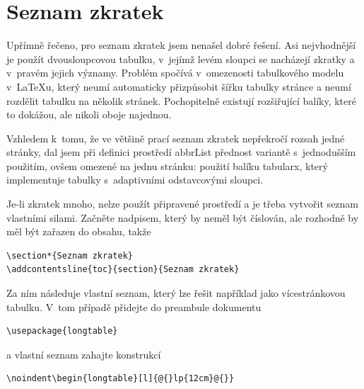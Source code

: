 \documentclass[FZS,DP,EN]{tulthesis}
\newcommand{\argument}[1]{{\ttfamily\color{\tulcolor}#1}}
\newenvironment{myquote}{\begin{list}{}{\setlength\leftmargin\parindent}\item[]}{\end{list}}
\newenvironment{listing}{\begin{myquote}\color{\tulcolor}}{\end{myquote}}
\begin{document}
\section{Seznam zkratek}\label{zkratky}

Upřímně řečeno, pro seznam zkratek jsem nenašel dobré řešení. Asi nejvhodnější
je použít dvousloupcovou tabulku, v~jejímž levém sloupci se nacházejí zkratky a
v~pravém jejich významy. Problém spočívá v~omezenosti tabulkového modelu
v~\LaTeX u, který neumí automaticky přizpůsobit šířku tabulky stránce a neumí
rozdělit tabulku na několik stránek. Pochopitelně existují rozšiřující balíky,
které to dokážou, ale nikoli oboje najednou.

Vzhledem k~tomu, že ve většině prací seznam zkratek nepřekročí rozsah jedné
stránky, dal jsem při definici prostředí \argument{abbrList} přednost variantě
s~jednodušším použitím, ovšem omezené na jednu stránku: použití balíku
\argument{tabularx}, který implementuje tabulky s~adaptivními odstavcovými
sloupci.

Je-li zkratek mnoho, nelze použít připravené prostředí a je třeba vytvořit
seznam vlastními silami. Začněte nadpisem, který by neměl být číslován, ale
rozhodně by měl být zařazen do obsahu, takže

\begin{listing}
\begin{verbatim}
\section*{Seznam zkratek}
\addcontentsline{toc}{section}{Seznam zkratek}
\end{verbatim}
\end{listing}

Za ním následuje vlastní seznam, který lze řešit například jako vícestránkovou
tabulku. V~tom případě přidejte do preambule dokumentu

\begin{listing}
\begin{verbatim}
\usepackage{longtable}
\end{verbatim}
\end{listing}

a vlastní seznam zahajte konstrukcí

\begin{listing}
\begin{verbatim}
\noindent\begin{longtable}[l]{@{}lp{12cm}@{}}
\end{verbatim}
\end{listing}
\end{document}

